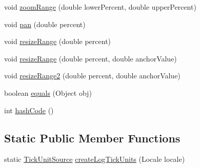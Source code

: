 \begin{DoxyCompactItemize}
\item 
void \mbox{\hyperlink{classorg_1_1jfree_1_1chart_1_1axis_1_1_log_axis_a025daf67859413ec0205412234eee098}{zoom\+Range}} (double lower\+Percent, double upper\+Percent)
\item 
void \mbox{\hyperlink{classorg_1_1jfree_1_1chart_1_1axis_1_1_log_axis_a87fd12234e64b90a677e7385f6c61285}{pan}} (double percent)
\item 
void \mbox{\hyperlink{classorg_1_1jfree_1_1chart_1_1axis_1_1_log_axis_a09bd5d4e99fd51010c8218c4dd98fef0}{resize\+Range}} (double percent)
\item 
void \mbox{\hyperlink{classorg_1_1jfree_1_1chart_1_1axis_1_1_log_axis_a2dcc786007fa518761dc291565cb7697}{resize\+Range}} (double percent, double anchor\+Value)
\item 
void \mbox{\hyperlink{classorg_1_1jfree_1_1chart_1_1axis_1_1_log_axis_ae4b89baaadc62724e2281aec612d5163}{resize\+Range2}} (double percent, double anchor\+Value)
\item 
boolean \mbox{\hyperlink{classorg_1_1jfree_1_1chart_1_1axis_1_1_log_axis_a56f495c315518e8bcc61aeba943a7411}{equals}} (Object obj)
\item 
int \mbox{\hyperlink{classorg_1_1jfree_1_1chart_1_1axis_1_1_log_axis_aea09eb0976a44769c91443fd0882a0eb}{hash\+Code}} ()
\end{DoxyCompactItemize}
\subsection*{Static Public Member Functions}
\begin{DoxyCompactItemize}
\item 
static \mbox{\hyperlink{interfaceorg_1_1jfree_1_1chart_1_1axis_1_1_tick_unit_source}{Tick\+Unit\+Source}} \mbox{\hyperlink{classorg_1_1jfree_1_1chart_1_1axis_1_1_log_axis_a1c8520b37c3859ceba7332717fd6ea36}{create\+Log\+Tick\+Units}} (Locale locale)
\end{DoxyCompactItemize}
